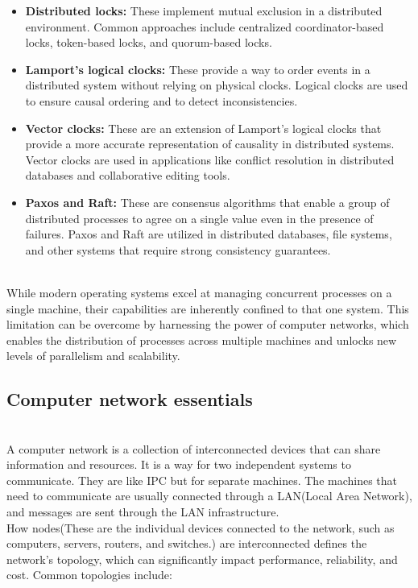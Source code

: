 \begin{itemize}
\item
\protect{}\label{fbGVNxFEPPo-PAgouIfRv}
\textbf{Distributed locks:} These implement mutual exclusion in a distributed environment. Common approaches include centralized coordinator-based locks, token-based locks, and quorum-based locks.
\item
\protect{}\label{DsehXau9YGQKTXlD9a0pd}
\textbf{Lamport's logical clocks:} These provide a way to order events in a distributed system without relying on physical clocks. Logical clocks are used to ensure causal ordering and to detect inconsistencies.
\item
\protect{}\label{jMRPy2vW6w0e6gefT0-3n}
\textbf{Vector clocks:} These are an extension of Lamport's logical clocks that provide a more accurate representation of causality in distributed systems. Vector clocks are used in applications like conflict resolution in distributed databases and collaborative editing tools.
\item
\protect{}\label{Xp7eVGrOuwGPHt853VGG6}
\textbf{Paxos and Raft:} These are consensus algorithms that enable a group of distributed processes to agree on a single value even in the presence of failures. Paxos and Raft are utilized in distributed databases, file systems, and other systems that require strong consistency guarantees.
\end{itemize}
\\
While modern operating systems excel at managing concurrent processes on a single machine, their capabilities are inherently confined to that one system. This limitation can be overcome by harnessing the power of computer networks, which enables the distribution of processes across multiple machines and unlocks new levels of parallelism and scalability.

\subsection{Computer network essentials}\label{pbuIydLLO-CRheNO7ib8-}
\\
A computer network is a collection of interconnected devices that can share information and resources. It is a way for two independent systems to communicate. They are like IPC but for separate machines. The machines that need to communicate are usually connected through a LAN(Local Area Network), and messages are sent through the LAN infrastructure.
\\
How nodes(These are the individual devices connected to the network, such as computers, servers, routers, and switches.) are interconnected defines the network's topology, which can significantly impact performance, reliability, and cost. Common topologies include:


